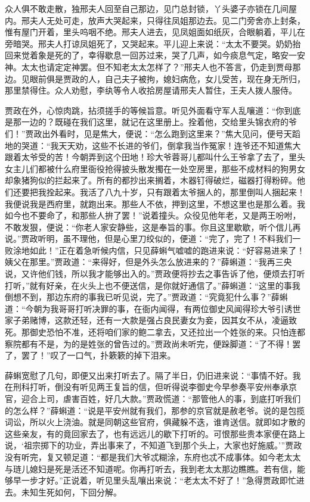 \begin{parag}
    众人俱不敢走散，独邢夫人回至自己那边，见门总封锁，丫头婆子亦锁在几间屋内。邢夫人无处可走，放声大哭起来，只得往凤姐那边去。见二门旁舍亦上封条，惟有屋门开着，里头呜咽不绝。邢夫人进去，见凤姐面如纸灰，合眼躺着，平儿在旁暗哭。邢夫人打谅凤姐死了，又哭起来。平儿迎上来说：“太太不要哭。奶奶抬回来觉着象是死的了，幸得歇息一回苏过来，哭了几声，如今痰息气定，略安一安神。太太也请定定神罢。但不知老太太怎样了？”邢夫人也不答言，仍走到贾母那边。见眼前俱是贾政的人，自己夫子被拘，媳妇病危，女儿受苦，现在身无所归，那里禁得住。众人劝慰，李纨等令人收拾房屋请邢夫人暂住，王夫人拨人服侍。
\end{parag}


\begin{parag}
    贾政在外，心惊肉跳，拈须搓手的等候旨意。听见外面看守军人乱嚷道：“你到底是那一边的？既碰在我们这里，就记在这里册上。拴着他，交给里头锦衣府的爷们！”贾政出外看时，见是焦大，便说：“怎么跑到这里来？”焦大见问，便号天蹈地的哭道：“我天天劝，这些不长进的爷们，倒拿我当作冤家！连爷还不知道焦大跟着太爷受的苦！今朝弄到这个田地！珍大爷蓉哥儿都叫什么王爷拿了去了，里头女主儿们都被什么府里衙役抢得披头散发擉在一处空房里，那些不成材料的狗男女却象猪狗似的拦起来了。所有的都抄出来搁着，木器钉得破烂，磁器打得粉碎。他们还要把我拴起来。我活了八九十岁，只有跟着太爷捆人的，那里倒叫人捆起来！我便说我是西府里，就跑出来。那些人不依，押到这里，不想这里也是那么着。我如今也不要命了，和那些人拚了罢！”说着撞头。众役见他年老，又是两王吩咐，不敢发狠，便说：“你老人家安静些，这是奉旨的事。你且这里歇歇，听个信儿再说。”贾政听明，虽不理他，但是心里刀绞似的，便道：“完了，完了！不料我们一败涂地如此！”正在着急听候内信，只见薛蝌气嘘嘘的跑进来说：“好容易进来了！姨父在那里。”贾政道：“来得好，但是外头怎么放进来的？”薛蝌道：“我再三央说，又许他们钱，所以我才能够出入的。”贾政便将抄去之事告诉了他，便烦去打听打听，”就有好亲，在火头上也不便送信，是你就好通信了。”薛蝌道：“这里的事我倒想不到，那边东府的事我已听见说，完了。”贾政道：“究竟犯什么事？”薛蝌道：“今朝为我哥哥打听决罪的事，在衙内闻得，有两位御史风闻得珍大爷引诱世家子弟赌博，这款还轻，还有一大款是强占良民妻女为妾，因其女不从，凌逼致死。那御史恐怕不准，还将咱们家的鲍二拿去，又还拉出一个姓张的来。只怕连都察院都有不是，为的是姓张的曾告过的。”贾政尚未听完，便跺脚道：“了不得！罢了，罢了！”叹了一口气，扑簌簌的掉下泪来。
\end{parag}


\begin{parag}
    薛蝌宽慰了几句，即便又出来打听去了。隔了半日，仍旧进来说：“事情不好。我在刑科打听，倒没有听见两王复旨的信，但听得说李御史今早参奏平安州奉承京官，迎合上司，虐害百姓，好几大款。”贾政慌道：“那管他人的事，到底打听我们的怎么样？”薛蝌道：“说是平安州就有我们，那参的京官就是赦老爷。说的是包揽词讼，所以火上浇油。就是同朝这些官府，俱藏躲不迭，谁肯送信。就即如才散的这些亲友，有的竟回家去了，也有远远儿的歇下打听的。可恨那些贵本家便在路上说，‘祖宗掷下的功业，弄出事来了，不知道飞到那个头上，大家也好施威。’”贾政没有听完，复又顿足道：“都是我们大爷忒糊涂，东府也忒不成事体。如今老太太与琏儿媳妇是死是活还不知道呢。你再打听去，我到老太太那边瞧瞧。若有信，能够早一步才好。”正说着，听见里头乱嚷出来说：“老太太不好了！”急得贾政即忙进去。未知生死如何，下回分解。
\end{parag}
